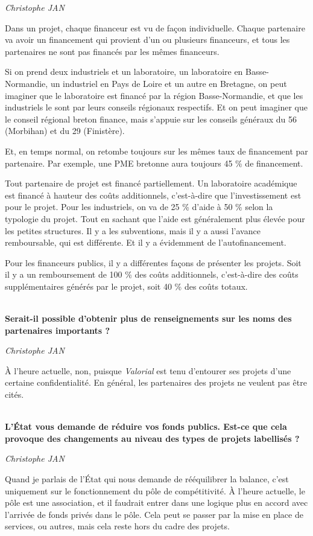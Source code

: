 \documentclass[a4paper,12pt]{report}
\begin{document}
	\emph{Christophe JAN}
	
    Dans un projet, chaque financeur est vu de façon individuelle. Chaque partenaire va avoir un financement qui provient d’un ou plusieurs financeurs, et tous les partenaires ne sont pas financés par les mêmes financeurs. 

	Si on prend deux industriels et un laboratoire, un laboratoire en Basse-Normandie, un industriel en Pays de Loire et un autre en Bretagne, on peut imaginer que le laboratoire est financé par la région Basse-Normandie, et que les industriels le sont par leurs conseils régionaux respectifs. Et on peut imaginer que le conseil régional breton finance, mais s’appuie sur les conseils généraux du 56 (Morbihan) et du 29 (Finistère).
	
	Et, en temps normal, on retombe toujours sur les mêmes taux de financement par partenaire. Par exemple, une PME bretonne aura toujours 45 \% de financement.

	Tout partenaire de projet est financé partiellement. Un laboratoire académique est financé à hauteur des coûts additionnels, c’est-à-dire que l’investissement est pour le projet. Pour les industriels, on va de 25 \% d’aide à 50 \% selon la typologie du projet. Tout en sachant que l’aide est généralement plus élevée pour les petites structures. Il y a les subventions, mais il y a aussi l’avance remboursable, qui est différente. Et il y a évidemment de l’autofinancement.
  
    Pour les financeurs publics, il y a différentes façons de présenter les projets. Soit il y a un remboursement de 100 \% des coûts additionnels, c’est-à-dire des coûts supplémentaires générés par le projet, soit 40 \% des coûts totaux.

	\textbf{\\Serait-il possible d’obtenir plus de renseignements sur les noms des partenaires importants ?}
	
	\emph{Christophe JAN}
	
    À l’heure actuelle, non, puisque \textit{Valorial} est tenu d’entourer ses projets d’une certaine confidentialité. En général, les partenaires des projets ne veulent pas être cités.

	\textbf{\\L’État vous demande de réduire vos fonds publics. Est-ce que cela provoque des changements au niveau des types de projets labellisés ?}

	\emph{Christophe JAN}
	
    Quand je parlais de l’État qui nous demande de rééquilibrer la balance, c’est uniquement sur le fonctionnement du pôle de compétitivité. À l’heure actuelle, le pôle est une association, et il faudrait entrer dans une logique plus en accord avec l’arrivée de fonds privés dans le pôle. Cela peut se passer par la mise en place de services, ou autres, mais cela reste hors du cadre des projets.
\end{document}
